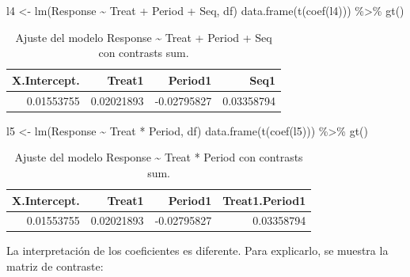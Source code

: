 \documentclass[
  12pt,
  a4paper,
  extrafontsizes,
  onecolumn,
  openright,
  table]{memoir}
\newenvironment{Shaded}{\begin{snugshade}}{\end{snugshade}}
\newcommand{\FunctionTok}[1]{\textcolor[rgb]{0.28,0.35,0.67}{#1}}
\newcommand{\NormalTok}[1]{\textcolor[rgb]{0.00,0.23,0.31}{#1}}
\newcommand{\OtherTok}[1]{\textcolor[rgb]{0.00,0.23,0.31}{#1}}
\newcommand{\SpecialCharTok}[1]{\textcolor[rgb]{0.37,0.37,0.37}{#1}}
\begin{document}
\scriptsize

\begin{Shaded}
\begin{Highlighting}[]
\NormalTok{l4 }\OtherTok{\textless{}{-}} \FunctionTok{lm}\NormalTok{(Response }\SpecialCharTok{\textasciitilde{}}\NormalTok{ Treat }\SpecialCharTok{+}\NormalTok{ Period }\SpecialCharTok{+}\NormalTok{ Seq, df)}
\FunctionTok{data.frame}\NormalTok{(}\FunctionTok{t}\NormalTok{(}\FunctionTok{coef}\NormalTok{(l4))) }\SpecialCharTok{\%\textgreater{}\%} \FunctionTok{gt}\NormalTok{()}
\end{Highlighting}
\end{Shaded}

\hypertarget{tbl-l4}{}
\begin{longtable}{rrrr}
\caption{\label{tbl-l4}Ajuste del modelo Response \textasciitilde{} Treat + Period + Seq con
contrasts sum. }\tabularnewline

\toprule
X.Intercept. & Treat1 & Period1 & Seq1 \\ 
\midrule
0.01553755 & 0.02021893 & -0.02795827 & 0.03358794 \\ 
\bottomrule
\end{longtable}

\normalsize

\scriptsize

\begin{Shaded}
\begin{Highlighting}[]
\NormalTok{l5 }\OtherTok{\textless{}{-}} \FunctionTok{lm}\NormalTok{(Response }\SpecialCharTok{\textasciitilde{}}\NormalTok{ Treat }\SpecialCharTok{*}\NormalTok{ Period, df)}
\FunctionTok{data.frame}\NormalTok{(}\FunctionTok{t}\NormalTok{(}\FunctionTok{coef}\NormalTok{(l5))) }\SpecialCharTok{\%\textgreater{}\%} \FunctionTok{gt}\NormalTok{()}
\end{Highlighting}
\end{Shaded}

\hypertarget{tbl-l5}{}
\begin{longtable}{rrrr}
\caption{\label{tbl-l5}Ajuste del modelo Response \textasciitilde{} Treat * Period con
contrasts sum. }\tabularnewline

\toprule
X.Intercept. & Treat1 & Period1 & Treat1.Period1 \\ 
\midrule
0.01553755 & 0.02021893 & -0.02795827 & 0.03358794 \\ 
\bottomrule
\end{longtable}

\normalsize

La interpretación de los coeficientes es diferente. Para explicarlo, se
muestra la matriz de contraste:
\end{document}
